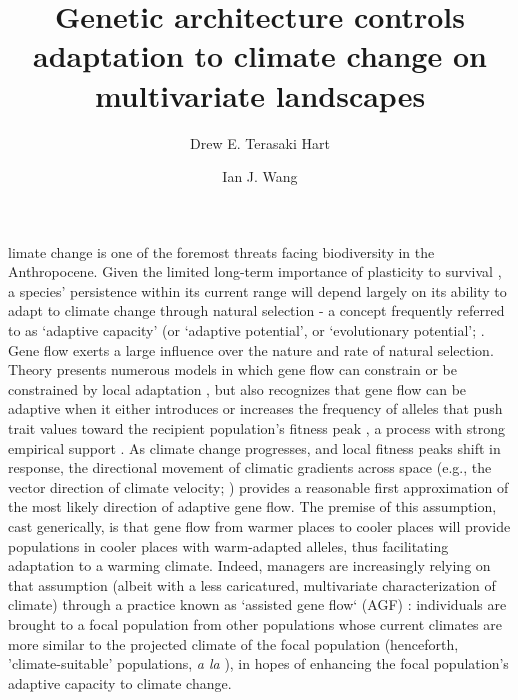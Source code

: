\documentclass[9pt,twocolumn,twoside,lineno]{pnas-new}
\title{Genetic architecture controls adaptation to climate change on multivariate landscapes}
\author[a,1]{Drew E. Terasaki Hart}
\author[a]{Ian J. Wang}
\affil[a]{Department of Environmental Science, Policy, and Management, University of California, Berkeley, CA 94720}
\begin{document}
\maketitle
\thispagestyle{firststyle}

limate change is one of the foremost threats facing biodiversity in the Anthropocene.
Given the limited long-term importance of plasticity to survival \cite{chevin},
a species’ persistence within its current range will depend largely on its ability to
adapt to climate change through natural selection - a concept frequently referred to 
as `adaptive capacity’ (or `adaptive potential’, or `evolutionary potential’; 
\cite{chevin,harrisson,nicotra,vilas,wade}.
Gene flow exerts a large influence over the nature and rate of natural selection. 
Theory presents numerous models
in which gene flow can constrain or be constrained by
local adaptation \cite{wang,lenormand,slatkin,haldane,wright,felsenstein},
but also recognizes that gene flow can be adaptive when it 
either introduces or increases the frequency of alleles 
that push trait values toward
the recipient population's fitness peak \cite{aitken_whitlock,slatkin,tigano},
a process with strong empirical support \cite{feder}. 
As climate change progresses,
and local fitness peaks shift in response, 
the directional movement of climatic gradients across space (e.g., the vector
direction of climate velocity; \cite{ackerly}) provides a reasonable first 
approximation of the most likely direction of adaptive gene flow. The premise of this 
assumption, cast generically, is that gene flow from warmer places to 
cooler places will provide populations in cooler places with warm-adapted alleles,
thus facilitating adaptation to a warming climate. 
Indeed, managers are increasingly relying on that assumption
(albeit with a less caricatured, multivariate characterization of climate)
through a practice known as `assisted gene flow` (AGF) \cite{aitken_whitlock}:
individuals are brought to a focal population
from other populations whose current 
climates are more similar to the projected climate of the focal population
(henceforth, 'climate-suitable' populations, \textit{a la} \cite{bellis}),
in hopes of enhancing the focal population's adaptive capacity to climate change.
\end{document}
